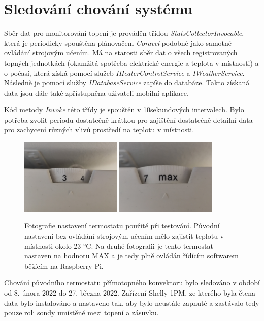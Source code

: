 \pagebreak

\section{Sledování chování systému}
Sběr dat pro monitorování topení je prováděn třídou {\it StatsCollectorInvocable}, která je periodicky spouštěna plánovačem {\it Coravel} podobně jako samotné ovládání strojovým učením. Má na starosti sběr dat o všech registrovaných topných jednotkách (okamžitá spotřeba elektrické energie a teplota v místnosti) a o počasí, která získá pomocí služeb {\it IHeaterControlService} a {\it IWeatherService}. Následně je pomocí služby {\it IDatabaseService} zapíše do databáze. Takto získaná data jsou dále také zpřístupněna uživateli mobilní aplikace.

Kód metody {\it Invoke} této třídy je spouštěn v 10sekundových intervalech. Bylo potřeba zvolit periodu dostatečně krátkou pro zajištění dostatečně detailní data pro zachycení různých vlivů prostředí na teplotu v místnosti.

\begin{figure}[H]
\centering
\includegraphics[width=0.43\textwidth]{obrazky-figures/test-term1.jpg}
\includegraphics[width=0.43\textwidth]{obrazky-figures/test-term2.jpg}
\caption{Fotografie nastavení termostatu použité při testování. Původní nastavení bez ovládání strojovým učením mělo zajistit teplotu v místnosti okolo 23 °C. Na druhé fotografii je tento termostat nastaven na hodnotu MAX a je tedy plně ovládán řídícím softwarem běžícím na Raspberry Pi.}
\end{figure}

Chování původního termostatu přímotopného konvektoru bylo sledováno v období od 8. února 2022 do 27. března 2022. Zařízení Shelly 1PM, ze kterého byla čtena data bylo instalováno a nastaveno tak, aby bylo neustále zapnuté a zastávalo tedy pouze roli sondy umístěné mezi topení a zásuvku.

